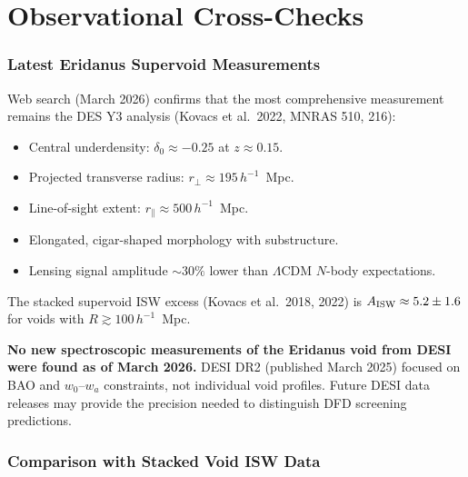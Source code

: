 \documentclass[11pt,a4paper]{article}
\begin{document}
\part{Observational Cross-Checks}
\label{part:obs}


\section{Latest Eridanus Supervoid Measurements}
\label{sec:obs-eridanus}

Web search (March 2026) confirms that the most comprehensive
measurement remains the DES Y3 analysis (Kovacs et al.\ 2022,
MNRAS 510, 216):

\begin{itemize}[nosep]
\item Central underdensity: $\delta_0 \approx -0.25$ at $z \approx 0.15$.
\item Projected transverse radius: $r_\perp \approx 195\,h^{-1}$~Mpc.
\item Line-of-sight extent: $r_\parallel \approx 500\,h^{-1}$~Mpc.
\item Elongated, cigar-shaped morphology with substructure.
\item Lensing signal amplitude $\sim 30\%$ lower than $\Lambda$CDM
  $N$-body expectations.
\end{itemize}

The stacked supervoid ISW excess (Kovacs et al.\ 2018, 2022) is
$A_{\rm ISW} \approx 5.2 \pm 1.6$ for voids with
$R \gtrsim 100\,h^{-1}$~Mpc.

\textbf{No new spectroscopic measurements of the Eridanus void from
DESI were found as of March 2026.} DESI DR2 (published March 2025)
focused on BAO and $w_0$--$w_a$ constraints, not individual void
profiles. Future DESI data releases may provide the precision needed
to distinguish DFD screening predictions.


\section{Comparison with Stacked Void ISW Data}
\label{sec:obs-stacked}
\end{document}
